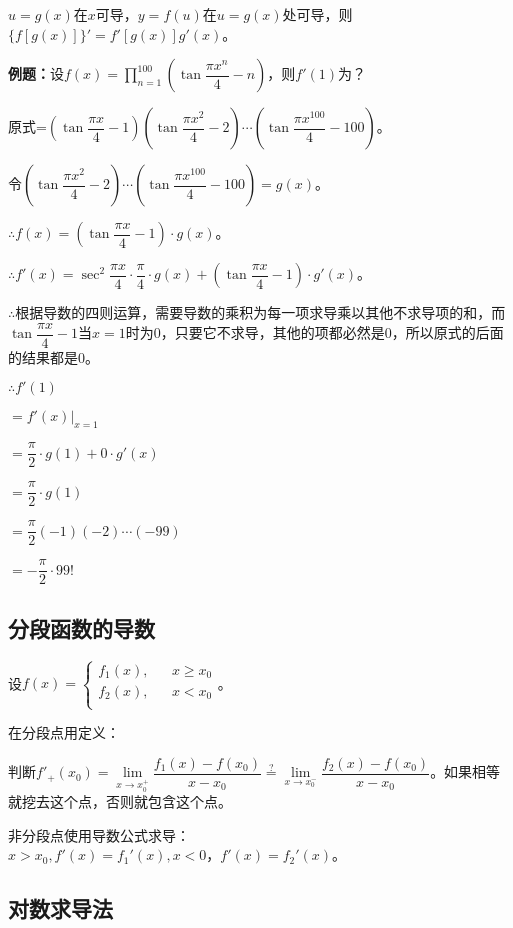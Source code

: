 \documentclass[UTF8, 12pt]{ctexart}
\begin{document}
$u=g(x)$在$x$可导，$y=f(u)$在$u=g(x)$处可导，则$\{f[g(x)]\}'=f'[g(x)]g'(x)$。

\textbf{例题：}设$f(x)=\prod\limits_{n=1}^{100}\left(\tan\dfrac{\pi x^n}{4}-n\right)$，则$f'(1)$为？

原式=$\left(\tan\dfrac{\pi x}{4}-1\right)\left(\tan\dfrac{\pi x^2}{4}-2\right)\cdots\left(\tan\dfrac{\pi x^{100}}{4}-100\right)$。

令$\left(\tan\dfrac{\pi x^2}{4}-2\right)\cdots\left(\tan\dfrac{\pi x^{100}}{4}-100\right)=g(x)$。\medskip

$\therefore f(x)=\left(\tan\dfrac{\pi x}{4}-1\right)\cdot g(x)$。\medskip

$\therefore f'(x)=\sec^2\dfrac{\pi x}{4}\cdot\dfrac{\pi}{4}\cdot g(x)+\left(\tan\dfrac{\pi x}{4}-1\right)\cdot g'(x)$。\medskip

$\therefore$根据导数的四则运算，需要导数的乘积为每一项求导乘以其他不求导项的和，而$\tan\dfrac{\pi x}{4}-1$当$x=1$时为0，只要它不求导，其他的项都必然是0，所以原式的后面的结果都是0。

$\therefore f'(1)$

$=f'(x)\vert_{x=1}$\medskip

$=\dfrac{\pi}{2}\cdot g(1)+0\cdot g'(x)$\medskip

$=\dfrac{\pi}{2}\cdot g(1)$\medskip

$=\dfrac{\pi}{2}(-1)(-2)\cdots(-99)$

$=-\dfrac{\pi}{2}\cdot 99!$

\subsection{分段函数的导数}

设$f(x)=\left\{
    \begin{array}{lcl}
        f_1(x), & & x\geqslant x_0 \\
        f_2(x), & & x<x_0 \\
    \end{array}
\right.$。\medskip

在分段点用定义：

判断$f'_+(x_0)=\lim\limits_{x\to x_0^+}\dfrac{f_1(x)-f(x_0)}{x-x_0}\overset{?}{=}\lim\limits_{x\to x_0^-}\dfrac{f_2(x)-f(x_0)}{x-x_0}$。如果相等就挖去这个点，否则就包含这个点。

非分段点使用导数公式求导：$x>x_0,f'(x)=f_1'(x),x<0，f'(x)=f_2'(x)$。

\subsection{对数求导法}
\end{document}
